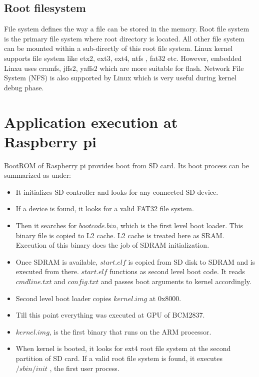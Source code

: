 \subsection {Root filesystem}
\indent File system defines the way a file can be stored in the memory.
Root file system is the primary file system where root directory is
located. All other file system can be mounted within a sub-directly of
this root file system. Linux kernel supports file system like etx2,
ext3, ext4, ntfs , fat32 etc. However, embedded Linxu uses cramfs,
jffs2, yaffs2 which are more suitable for flash. Network File System
(NFS) is also supported by Linux which is very useful during kernel
debug phase.
\section {Application execution at Raspberry pi}
BootROM of Raspberry pi provides boot from SD card. Its boot process can
be summarized as under:
\begin{itemize}
 \item It initializes SD controller and looks for any connected
 SD device.
 \item If a device is found, it looks for a valid FAT32 file
 system.
 \item Then it searches for $bootcode.bin$, which is the first
 level boot loader. This binary file is copied to L2
 cache. L2 cache is treated here as SRAM. Execution of
 this binary does the job of SDRAM initialization.
 \item Once SDRAM is available, $start.elf$ is copied from SD
 disk to SDRAM and is executed from there. $start.elf$
 functions as second level boot code. It reads
 $cmdline.txt$ and $config.txt$ and passes boot arguments to
 kernel accordingly.
 \item Second level boot loader copies $kernel.img$ at 0x8000.
 \item Till this point everything was executed at GPU of BCM2837.
 \item $kernel.img$, is the first binary that runs on the ARM
 processor.
 \item When kernel is booted, it looks for ext4 root file system at
 the second partition of SD card. If a valid root file
 system is found, it executes $/sbin/init$ , the first user
 process.
\end{itemize}
